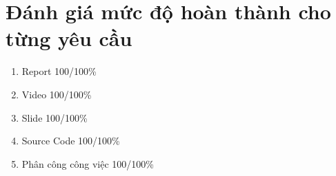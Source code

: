 \chapter*{Đánh giá mức độ hoàn thành cho từng yêu cầu}
\label{hoanthanhtungyeucau}
\begin{enumerate}
    \item Report 100/100\%
    \item Video 100/100\%
    \item Slide 100/100\%
    \item Source Code 100/100\%
    \item Phân công công việc 100/100\%
\end{enumerate}